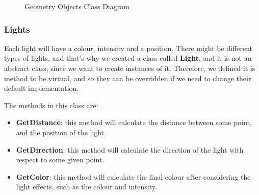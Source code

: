 \documentclass[a4paper]{article}
\begin{document}
	\begin{figure}[ht!]
		\centering
		\caption{Geometry Objects Class Diagram}
		\label{fig:geo}
	\end{figure}
	\subsubsection{Lights}
	Each light will have a colour, intensity and a position. There might be different types of lights, and that's why we created a class called \textbf{Light}, and it is not an abstract class; since we want to create instances of it. Therefore, we defined it is method to be virtual, and so they can be overridden if we need to change their default implementation.
	\par The methods in this class are:
	\begin{itemize}
		\item \textbf{GetDistance}: this method will calculate the distance between some point, and the position of the light.	 	\item \textbf{GetDirection}: this method will calculate the direction of the light with respect to some given point.
		\item \textbf{GetColor}: this method will calculate the final colour after considering the light effects, such as the colour and intensity.
	\end{itemize}
\end{document}

